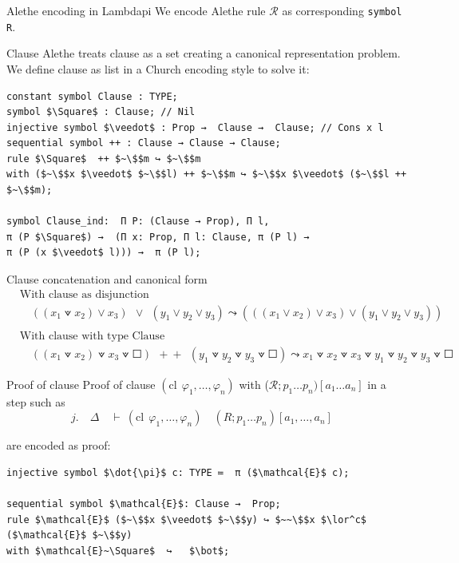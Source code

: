 \documentclass[aspectratio=169,xcolor={dvipsnames}]{beamer}
\begin{document}
\begin{frame}[t,fragile]{Alethe encoding in Lambdapi}
We encode Alethe rule $\mathcal{R}$ as corresponding \lstinline{symbol R}.
\begin{block}{Clause}
Alethe treats clause as a set creating a canonical representation problem. We define clause as list in a Church encoding style to solve it:

\begin{lstlisting}[mathescape=true]
constant symbol Clause : TYPE;
symbol $\Square$ : Clause; // Nil
injective symbol $\veedot$ : Prop →  Clause →  Clause; // Cons x l
sequential symbol ++ : Clause → Clause → Clause;
rule $\Square$  ++ $~\$$m ↪ $~\$$m
with ($~\$$x $\veedot$ $~\$$l) ++ $~\$$m ↪ $~\$$x $\veedot$ ($~\$$l ++ $~\$$m);

symbol Clause_ind:  Π P: (Clause → Prop), Π l,
π (P $\Square$) →  (Π x: Prop, Π l: Clause, π (P l) →
π (P (x $\veedot$ l))) →  π (P l);
\end{lstlisting}
\end{block}
\end{frame}


\begin{frame}{Clause concatenation and canonical form}
\begin{align*}
&\text{With clause as disjunction}\\
&\quad ((x_1 \veedot x_2) \lor x_3) ~~\lor~~ (y_1 \lor y_2 \lor y_3) \leadsto (((x_1 \lor x_2) \lor x_3) \lor (y_1 \lor y_2 \lor y_3))\\  
&\\
&\text{With clause with type Clause}\\
&\quad ((x_1 \veedot x_2) \veedot x_3 \veedot \Square) ~~+\!+~~ (y_1 \veedot y_2 \veedot y_3 \veedot \Square) \leadsto x_1 \veedot x_2 \veedot x_3 \veedot y_1 \veedot y_2 \veedot y_3 \veedot \Square
\end{align*}
\end{frame}

\begin{frame}[t,fragile]{Proof of clause}
Proof of clause $(\text{cl}~~\varphi_1, \dots ,\varphi_n)$ with ($\mathcal{R}; p_1 \dots p_n)[a_1 \dots a_n]$ in a step such as
\begin{equation*}
    j. \quad  \Delta \quad \vdash~ (\text{cl}~~\varphi_1, \dots ,\varphi_n) \quad (R; p_1 \dots p_n)[a_1, \dots, a_n]\quad
\end{equation*}

are encoded as proof:
\begin{lstlisting}[mathescape=true]
injective symbol $\dot{\pi}$ c: TYPE ≔  π ($\mathcal{E}$ c);

sequential symbol $\mathcal{E}$: Clause →  Prop;
rule $\mathcal{E}$ ($~\$$x $\veedot$ $~\$$y) ↪ $~~\$$x $\lor^c$ ($\mathcal{E}$ $~\$$y)
with $\mathcal{E}~\Square$  ↪   $\bot$;
\end{lstlisting}
\end{frame}
\end{document}
